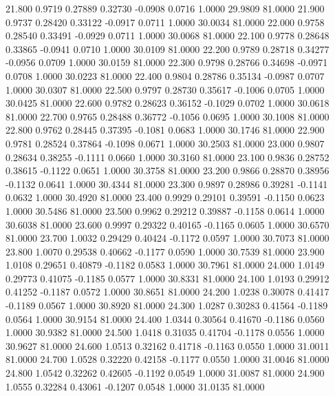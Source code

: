   21.800   0.9719   0.27889   0.32730  -0.0908   0.0716   1.0000  29.9809  81.0000
  21.900   0.9737   0.28420   0.33122  -0.0917   0.0711   1.0000  30.0034  81.0000
  22.000   0.9758   0.28540   0.33491  -0.0929   0.0711   1.0000  30.0068  81.0000
  22.100   0.9778   0.28648   0.33865  -0.0941   0.0710   1.0000  30.0109  81.0000
  22.200   0.9789   0.28718   0.34277  -0.0956   0.0709   1.0000  30.0159  81.0000
  22.300   0.9798   0.28766   0.34698  -0.0971   0.0708   1.0000  30.0223  81.0000
  22.400   0.9804   0.28786   0.35134  -0.0987   0.0707   1.0000  30.0307  81.0000
  22.500   0.9797   0.28730   0.35617  -0.1006   0.0705   1.0000  30.0425  81.0000
  22.600   0.9782   0.28623   0.36152  -0.1029   0.0702   1.0000  30.0618  81.0000
  22.700   0.9765   0.28488   0.36772  -0.1056   0.0695   1.0000  30.1008  81.0000
  22.800   0.9762   0.28445   0.37395  -0.1081   0.0683   1.0000  30.1746  81.0000
  22.900   0.9781   0.28524   0.37864  -0.1098   0.0671   1.0000  30.2503  81.0000
  23.000   0.9807   0.28634   0.38255  -0.1111   0.0660   1.0000  30.3160  81.0000
  23.100   0.9836   0.28752   0.38615  -0.1122   0.0651   1.0000  30.3758  81.0000
  23.200   0.9866   0.28870   0.38956  -0.1132   0.0641   1.0000  30.4344  81.0000
  23.300   0.9897   0.28986   0.39281  -0.1141   0.0632   1.0000  30.4920  81.0000
  23.400   0.9929   0.29101   0.39591  -0.1150   0.0623   1.0000  30.5486  81.0000
  23.500   0.9962   0.29212   0.39887  -0.1158   0.0614   1.0000  30.6038  81.0000
  23.600   0.9997   0.29322   0.40165  -0.1165   0.0605   1.0000  30.6570  81.0000
  23.700   1.0032   0.29429   0.40424  -0.1172   0.0597   1.0000  30.7073  81.0000
  23.800   1.0070   0.29538   0.40662  -0.1177   0.0590   1.0000  30.7539  81.0000
  23.900   1.0108   0.29651   0.40879  -0.1182   0.0583   1.0000  30.7961  81.0000
  24.000   1.0149   0.29773   0.41075  -0.1185   0.0577   1.0000  30.8331  81.0000
  24.100   1.0193   0.29912   0.41252  -0.1187   0.0572   1.0000  30.8651  81.0000
  24.200   1.0238   0.30078   0.41417  -0.1189   0.0567   1.0000  30.8920  81.0000
  24.300   1.0287   0.30283   0.41564  -0.1189   0.0564   1.0000  30.9154  81.0000
  24.400   1.0344   0.30564   0.41670  -0.1186   0.0560   1.0000  30.9382  81.0000
  24.500   1.0418   0.31035   0.41704  -0.1178   0.0556   1.0000  30.9627  81.0000
  24.600   1.0513   0.32162   0.41718  -0.1163   0.0550   1.0000  31.0011  81.0000
  24.700   1.0528   0.32220   0.42158  -0.1177   0.0550   1.0000  31.0046  81.0000
  24.800   1.0542   0.32262   0.42605  -0.1192   0.0549   1.0000  31.0087  81.0000
  24.900   1.0555   0.32284   0.43061  -0.1207   0.0548   1.0000  31.0135  81.0000
